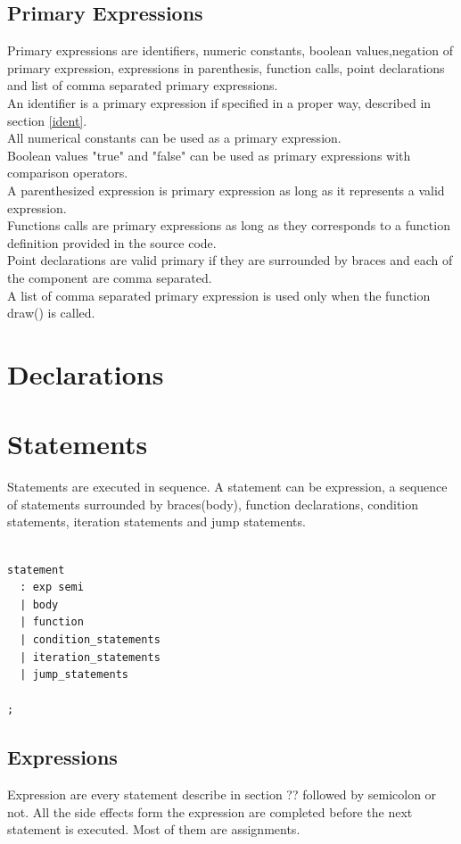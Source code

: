 \documentclass{l3proj}
\begin{document}
\subsection{Primary Expressions}
Primary expressions are identifiers, numeric constants, boolean values,negation of primary expression, expressions in parenthesis, function calls, point declarations  and list of comma separated primary expressions.\\
An identifier is a primary expression if specified in a proper way, described in section \ref{ident}.\\ All numerical constants can be used as a primary expression.\\ Boolean values "true" and "false" can be used as primary expressions with comparison operators.\\ A parenthesized expression is primary expression as long as it represents a valid expression.\\ Functions calls are primary expressions as long as they corresponds to a function definition provided in the source code. \\Point declarations are valid primary  if they are surrounded by braces and each of the component are comma separated.\\ A list of comma separated primary expression is used only when the function draw() is called.  

\section {Declarations}
\section {Statements}
Statements are executed in sequence. A statement can be expression, a sequence of statements surrounded by braces(body), function declarations, condition statements, iteration statements and jump statements.

\begin{lstlisting}

statement
  : exp semi
  | body
  | function
  | condition_statements
  | iteration_statements
  | jump_statements

;

\end{lstlisting}

\subsection{Expressions} 
Expression are every statement describe in section ?? followed by semicolon or not. All the side effects form the expression are completed before the next statement is executed. Most of them are assignments. 
\end{document}
